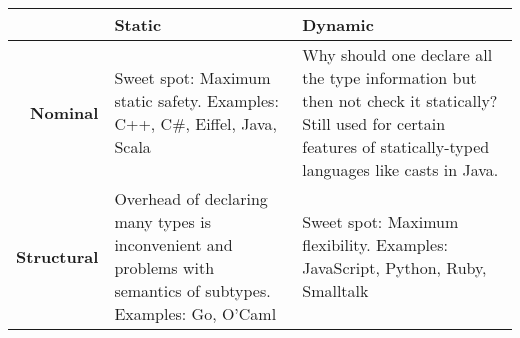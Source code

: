 \begin{mytitle}\hfill
\begin{center}
    \begin{tabular}{r | C{0.4\textwidth} | C{0.4\textwidth}}
         & \textbf{Static} & \textbf{Dynamic}\Bstrut\Tstrut\\[0.5em]
         \hline
        \textbf{Nominal} & Sweet spot: Maximum static safety. Examples: C++, C\#, Eiffel, Java, Scala & Why should one declare all the type information but then not check it statically? Still used for certain features of statically-typed languages like casts in Java. \Bstrut\Tstrut\\[0.5em]
        \hline
        \textbf{Structural} & Overhead of declaring many types is inconvenient and problems with semantics of subtypes. Examples: Go, O'Caml & Sweet spot: Maximum flexibility. Examples: JavaScript, Python, Ruby, Smalltalk \Bstrut\Tstrut\\[0.5em]
    \end{tabular}
\end{center}
\end{mytitle}

